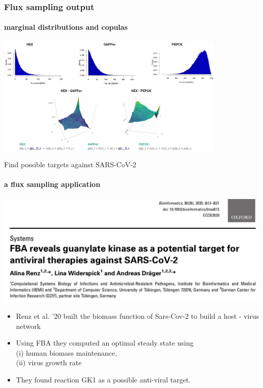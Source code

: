 \documentclass{beamer}
\begin{document}
   \begin{frame}
      \frametitle{Flux sampling output}
      \framesubtitle{marginal distributions and copulas}
      \includegraphics[width=110mm]{resources/copulas_cropped_transp.png}

   \end{frame}

   \begin{frame}{Find possible targets against SARS-CoV-2}
      \framesubtitle{a flux sampling application}
      \bigskip
      \includegraphics[scale=0.27]{ ../met_nets/resources//covid_paper.png}
      
      \begin{singlespace}
         \begin{itemize}
            \item \small Renz et al. '20 built the biomass function of Sars-Cov-2 to build a host - virus network
            \item \small Using FBA they computed an optimal steady state using \\ \small \quad (i) human biomass maintenance,\\ \small \quad (ii) virus growth rate
            \item \small They found reaction GK1 as a possible anti-viral target.
         \end{itemize}            
      \end{singlespace}

   \end{frame}
\end{document}
